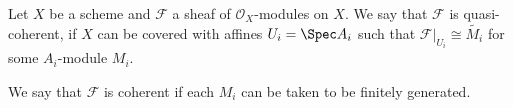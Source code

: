 Let $X$ be a scheme and $\mathcal{F}$ a sheaf of $\mathcal{O}_X$-modules on $X$. We say that $\mathcal{F}
$ is quasi-coherent, if $X$ can be covered with affines $U_i = \Spec A_i$ such that
$\mathcal{F}|_{U_i} \cong \tilde{M_i}$ for some $A_i$-module $M_i$.

We say that $\mathcal{F}$ is coherent if each $M_i$ can be taken to be finitely generated.
